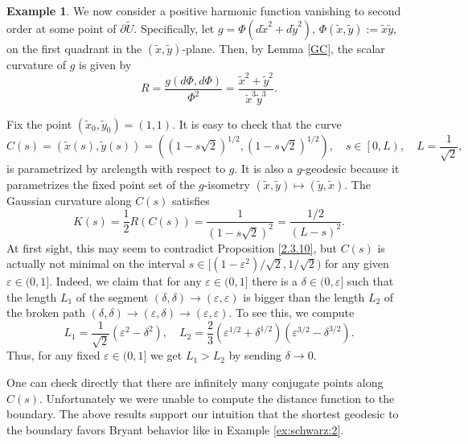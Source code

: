 \documentclass[11pt,reqno]{amsart}
\theoremstyle{plain}
\theoremstyle{definition}
\newtheorem{example}[theorem]{Example}
\numberwithin{equation}{section}
\begin{document}
\begin{example}\label{ex:2nd:order:harmonic}
    We now consider a positive harmonic function vanishing to second order at some point of $\partial\widetilde{U}$. Specifically, let $g =\Phi(d\tilde{x}^2+d\tilde{y}^2)$, $\Phi(\tilde{x},\tilde{y}):=\tilde{x}\tilde{y}$, on the first quadrant in the $(\tilde{x},\tilde{y})$-plane. Then, 
    by Lemma \ref{GC}, the scalar curvature of $g$ is given by
    $$
      R = \frac{g(d\Phi,d\Phi)}{\Phi^2} =\displaystyle \frac{\tilde{x}^2+\tilde{y}^2}{\tilde{x}^3 \tilde{y}^3}.$$

    \noindent Fix the point $(\tilde{x}_0,\tilde{y}_0) = (1,1)$. It is easy to check that the curve
    $$C(s)= (\tilde{x}(s),\tilde{y}(s)) = ((1-s\sqrt{2})^{1/2},(1-s\sqrt{2})^{1/2}), \quad s\in\left[0,L\right), \quad L=\frac{1}{\sqrt{2}},$$
    is parametrized by arclength with respect to $g$. It is also a $g$-geodesic because it parametrizes the fixed point set of the $g$-isometry $(\tilde{x},\tilde{y}) \mapsto (\tilde{y},\tilde{x})$. The Gaussian curvature along $C(s)$ satisfies
    $$K(s) =\frac{1}{2}R(C(s))=\frac{1}{\displaystyle (1-s\sqrt{2})^{2}}= \frac{1/2}{(L-s)^2}.$$
    At first sight, this may seem to contradict Proposition \ref{2.3.10}, but $C(s)$ is actually not minimal on the interval $s \in [(1-\varepsilon^2)/\sqrt{2}, 1/\sqrt{2})$ for any given $\varepsilon \in (0,1]$. Indeed, we claim that for any $\varepsilon \in (0,1]$ there is a $\delta \in (0,\varepsilon]$ such that the length $L_1$ of the segment 
    $(\delta,\delta ) \to (\varepsilon ,\varepsilon)$
    is bigger than the length $L_2$ of the broken path
    $(\delta ,\delta ) \to (\varepsilon ,\delta ) \to (\varepsilon ,\varepsilon ).$
    To see this, we compute $$L_1=\frac{1}{\sqrt{2}}(\varepsilon^2-\delta^2), \quad L_2 =\frac{2}{3}(\varepsilon^{1/2} + \delta^{1/2})(\varepsilon^{3/2}-\delta^{3/2}).$$ Thus, for any fixed $\varepsilon \in (0,1]$ we get $L_1 > L_2$ by sending $\delta \to 0$.
    
     One can check directly that there are infinitely many conjugate points along $C(s)$. Unfortunately we were unable to compute the distance function to the boundary. The above results support our intuition that the shortest geodesic to the boundary favors Bryant behavior like in Example \ref{ex:schwarz:2}.
\end{example}



\end{document}
